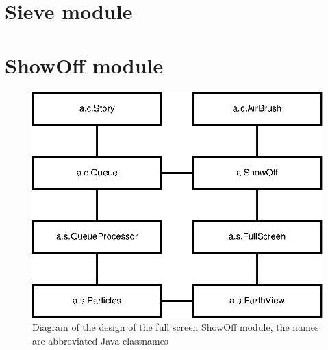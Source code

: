 \section{Sieve module}

\section{ShowOff module}

\begin{figure}
  \centering
  \includegraphics{image/showoff-fullscreen}
  \caption{
    Diagram of the design of the full screen ShowOff module, the names are
    abbreviated Java classnames
  }
\end{figure}

